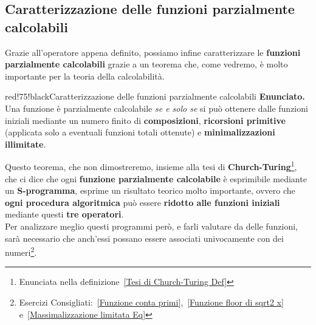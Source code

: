 \subsection{Caratterizzazione delle funzioni parzialmente calcolabili}

Grazie all'operatore appena definito, possiamo infine caratterizzare le \textbf{funzioni parzialmente calcolabili} grazie a un teorema che, come vedremo, è molto importante per la teoria della calcolabilità.

\begin{halfframedbox}{red!75!black}{Caratterizzazione delle funzioni parzialmente calcolabili}\label{Caratterizzazione delle funzioni parzialmente calcolabili}
  \textbf{Enunciato.} Una funzione è parzialmente calcolabile \textit{se e solo se} si può ottenere dalle funzioni iniziali mediante un numero finito di \textbf{composizioni}, \textbf{ricorsioni primitive} (applicata solo a eventuali funzioni totali ottenute) e \textbf{minimalizzazioni illimitate}.
\end{halfframedbox}

Questo teorema, che non dimostreremo, insieme alla tesi di \textbf{Church-Turing}\footnote{Enunciata nella definizione~\ref{Tesi di Church-Turing Def}}, che ci dice che ogni \textbf{funzione parzialmente calcolabile} è esprimibile mediante un \textbf{S-programma}, esprime un risultato teorico molto importante, ovvero che \textbf{ogni procedura algoritmica} può essere \textbf{ridotto alle funzioni iniziali} mediante questi \textbf{tre operatori}. \\
Per analizzare meglio questi programmi però, e farli valutare da delle funzioni, sarà necessario che anch'essi possano essere associati univocamente con dei numeri\footnote{Esercizi Consigliati:~\ref{Funzione conta primi},~\ref{Funzione floor di sqrt2 x} e~\ref{Massimalizzazione limitata Eq}}.